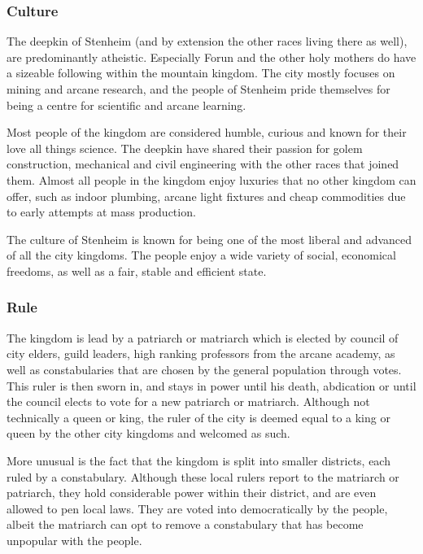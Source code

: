 \subsubsection{Culture}

The deepkin of Stenheim (and by extension the other races living there as
well), are predominantly atheistic. Especially Forun and the other holy
mothers do have a sizeable following within the mountain kingdom. The city
mostly focuses on mining and arcane research, and the people of Stenheim pride
themselves for being a centre for scientific and arcane learning.

Most people of the kingdom are considered humble, curious and known for their
love all things science. The deepkin have shared their passion for golem
construction, mechanical and civil engineering with the other races that joined
them. Almost all people in the kingdom enjoy luxuries that no other kingdom can
offer, such as indoor plumbing, arcane light fixtures and cheap commodities due
to early attempts at mass production.

The culture of Stenheim is known for being one of the most liberal and
advanced of all the city kingdoms. The people enjoy a wide variety of social,
economical freedoms, as well as a fair, stable and efficient state.

\subsubsection{Rule}

The kingdom is lead by a patriarch or matriarch which is elected by council of
city elders, guild leaders, high ranking professors from the arcane academy,
as well as constabularies that are chosen by the general population through
votes. This ruler is then sworn in, and stays in power until his death,
abdication or until the council elects to vote for a new patriarch or
matriarch. Although not technically a queen or king, the ruler of the city is
deemed equal to a king or queen by the other city kingdoms and welcomed as
such.

More unusual is the fact that the kingdom is split into smaller districts,
each ruled by a constabulary. Although these local rulers report to the
matriarch or patriarch, they hold considerable power within their district,
and are even allowed to pen local laws. They are voted into democratically
by the people, albeit the matriarch can opt to remove a constabulary that has
become unpopular with the people.

